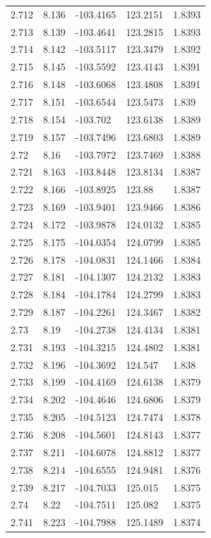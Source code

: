 \begin{tabular}{lllll}
2.712 & 8.136 & -103.4165 & 123.2151 & 1.8393 \\
2.713 & 8.139 & -103.4641 & 123.2815 & 1.8393 \\
2.714 & 8.142 & -103.5117 & 123.3479 & 1.8392 \\
2.715 & 8.145 & -103.5592 & 123.4143 & 1.8391 \\
2.716 & 8.148 & -103.6068 & 123.4808 & 1.8391 \\
2.717 & 8.151 & -103.6544 & 123.5473 & 1.839 \\
2.718 & 8.154 & -103.702 & 123.6138 & 1.8389 \\
2.719 & 8.157 & -103.7496 & 123.6803 & 1.8389 \\
2.72 & 8.16 & -103.7972 & 123.7469 & 1.8388 \\
2.721 & 8.163 & -103.8448 & 123.8134 & 1.8387 \\
2.722 & 8.166 & -103.8925 & 123.88 & 1.8387 \\
2.723 & 8.169 & -103.9401 & 123.9466 & 1.8386 \\
2.724 & 8.172 & -103.9878 & 124.0132 & 1.8385 \\
2.725 & 8.175 & -104.0354 & 124.0799 & 1.8385 \\
2.726 & 8.178 & -104.0831 & 124.1466 & 1.8384 \\
2.727 & 8.181 & -104.1307 & 124.2132 & 1.8383 \\
2.728 & 8.184 & -104.1784 & 124.2799 & 1.8383 \\
2.729 & 8.187 & -104.2261 & 124.3467 & 1.8382 \\
2.73 & 8.19 & -104.2738 & 124.4134 & 1.8381 \\
2.731 & 8.193 & -104.3215 & 124.4802 & 1.8381 \\
2.732 & 8.196 & -104.3692 & 124.547 & 1.838 \\
2.733 & 8.199 & -104.4169 & 124.6138 & 1.8379 \\
2.734 & 8.202 & -104.4646 & 124.6806 & 1.8379 \\
2.735 & 8.205 & -104.5123 & 124.7474 & 1.8378 \\
2.736 & 8.208 & -104.5601 & 124.8143 & 1.8377 \\
2.737 & 8.211 & -104.6078 & 124.8812 & 1.8377 \\
2.738 & 8.214 & -104.6555 & 124.9481 & 1.8376 \\
2.739 & 8.217 & -104.7033 & 125.015 & 1.8375 \\
2.74 & 8.22 & -104.7511 & 125.082 & 1.8375 \\
2.741 & 8.223 & -104.7988 & 125.1489 & 1.8374 \\

\end{tabular}
